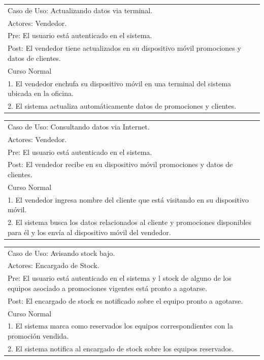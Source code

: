 \vspace{1cm}

\begin{tabular}{ | p{14cm} | }
  \hline
  Caso de Uso: Actualizando datos via terminal. \\
  Actores: Vendedor. \\
  Pre: El usuario está autenticado en el sistema. \\
  Post: El vendedor tiene actualizados en su dispositivo móvil promociones y datos de clientes. \\
  \hline
  Curso Normal\\
  \hline
  1. El vendedor enchufa su dispositivo móvil en una terminal del sistema ubicada en la oficina. \\
  2. El sistema actualiza automáticamente datos de promociones y clientes. \\
  \hline
\end{tabular}

\vspace{1cm}

\begin{tabular}{ | p{14cm} | }
  \hline
  Caso de Uso: Consultando datos via Internet. \\
  Actores: Vendedor. \\
  Pre: El usuario está autenticado en el sistema. \\
  Post: El vendedor recibe en su dispositivo móvil promociones y datos de clientes. \\
  \hline
  Curso Normal\\
  \hline
  1. El vendedor ingresa nombre del cliente que está visitando en su dispositivo móvil. \\
  2. El sistema busca los datos relacionados al cliente y promociones disponibles para él y los envía al dispositivo móvil del vendedor. \\
  \hline
\end{tabular}

\vspace{1cm}

\begin{tabular}{ | p{14cm} | }
  \hline
  Caso de Uso: Avisando stock bajo. \\
  Actores: Encargado de Stock. \\
  Pre: El usuario está autenticado en el sistema y l stock de alguno de los equipos asociado a promociones vigentes está pronto a agotarse. \\
  Post: El encargado de stock es notificado sobre el equipo pronto a agotarse. \\
  \hline
  Curso Normal\\
  \hline
  1. El sistema marca como reservados los equipos correspondientes con la promoción vendida.\\
  2. El sistema notifica al encargado de stock sobre los equipos reservados.\\
  \hline
\end{tabular}

